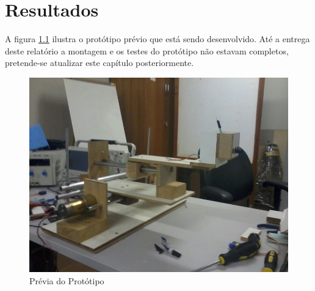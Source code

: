 
\chapter[Resultados]{Resultados}

A figura \ref{resultado} ilustra o protótipo prévio que está sendo desenvolvido. Até a entrega deste relatório a montagem e os testes do protótipo não estavam completos, pretende-se atualizar este capítulo posteriormente.


\begin{figure}[H]
		\centering
			\includegraphics[scale=0.5]{figuras/resultado.jpg}
		\caption{Prévia do Protótipo}
		\label{resultado}
\end{figure}